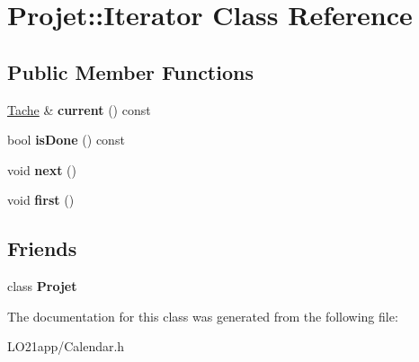 \hypertarget{class_projet_1_1_iterator}{}\section{Projet\+:\+:Iterator Class Reference}
\label{class_projet_1_1_iterator}
\subsection*{Public Member Functions}
\begin{DoxyCompactItemize}
\item 
\hypertarget{class_projet_1_1_iterator_ad86c65c6828ffdce66bd5d77851acf72}{}\hyperlink{class_tache}{Tache} \& {\bfseries current} () const \label{class_projet_1_1_iterator_ad86c65c6828ffdce66bd5d77851acf72}

\item 
\hypertarget{class_projet_1_1_iterator_ab1cb3afe4732de443b1a4987a3888675}{}bool {\bfseries is\+Done} () const \label{class_projet_1_1_iterator_ab1cb3afe4732de443b1a4987a3888675}

\item 
\hypertarget{class_projet_1_1_iterator_a2e93894b4d3ec6961fa227f52d720b19}{}void {\bfseries next} ()\label{class_projet_1_1_iterator_a2e93894b4d3ec6961fa227f52d720b19}

\item 
\hypertarget{class_projet_1_1_iterator_a2c2d2e1c2a601d6123048efa0d48daf6}{}void {\bfseries first} ()\label{class_projet_1_1_iterator_a2c2d2e1c2a601d6123048efa0d48daf6}

\end{DoxyCompactItemize}
\subsection*{Friends}
\begin{DoxyCompactItemize}
\item 
\hypertarget{class_projet_1_1_iterator_ab87b41c3faa36955cc370972f5cce344}{}class {\bfseries Projet}\label{class_projet_1_1_iterator_ab87b41c3faa36955cc370972f5cce344}

\end{DoxyCompactItemize}


The documentation for this class was generated from the following file\+:\begin{DoxyCompactItemize}
\item 
L\+O21app/Calendar.\+h\end{DoxyCompactItemize}
